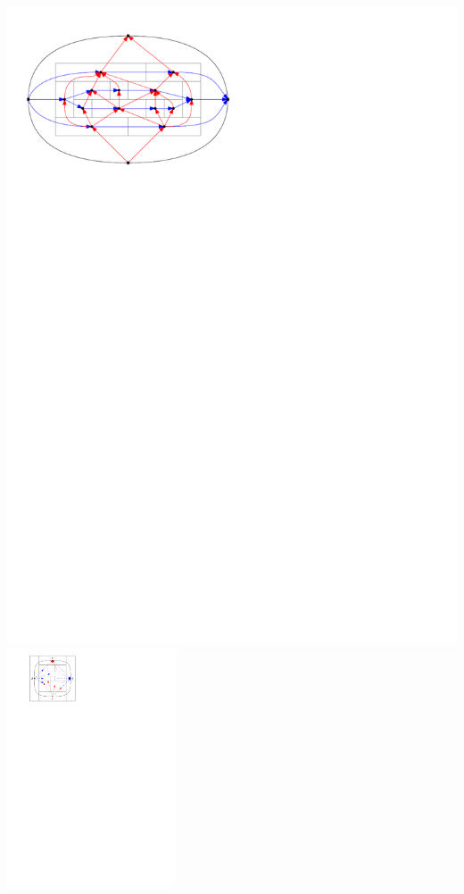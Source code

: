 \documentclass[a4paper]{article}
\begin{document}
\includegraphics[scale=1]{rectangularDuals/img/relSegmentFaceRescale}
\clearpage%
\includegraphics[width=5cm]{./fixExtension/img/sep4cycle.pdf}
\clearpage%
\end{document}
